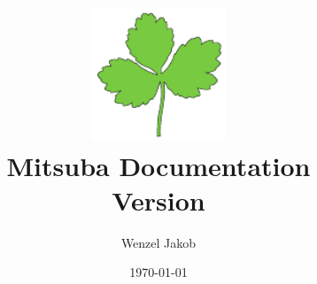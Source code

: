 \documentclass[footinclude=false,11pt,DIV11]{scrartcl}
\title{
    \vspace{3cm}
    \includegraphics[width=4cm]{images/logo_plain.pdf}\\\vspace{1.5cm}
    \Huge
    Mitsuba Documentation\\\vspace{4mm}
    \LARGE Version \MitsubaVersion
    \vspace{5mm}
}
\author{Wenzel Jakob}
\date{\today}
\begin{document}
\maketitle
\clearpage
\ofoot[\pagemark]{\pagemark}

\tableofcontents
















\end{document}
